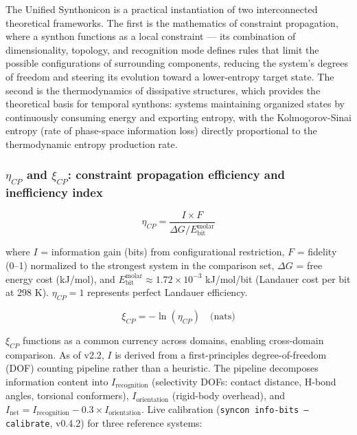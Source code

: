 \documentclass[12pt,a4paper]{article}
\begin{document}
The Unified Synthonicon is a practical instantiation of two interconnected theoretical frameworks. The first is the mathematics of constraint propagation, where a synthon functions as a local constraint --- its combination of dimensionality, topology, and recognition mode defines rules that limit the possible configurations of surrounding components, reducing the system's degrees of freedom and steering its evolution toward a lower-entropy target state. The second is the thermodynamics of dissipative structures, which provides the theoretical basis for temporal synthons: systems maintaining organized states by continuously consuming energy and exporting entropy, with the Kolmogorov-Sinai entropy (rate of phase-space information loss) directly proportional to the thermodynamic entropy production rate.

\subsubsection{$\eta_{CP}$ and $\xi_{CP}$: constraint propagation efficiency and inefficiency index}

\[\eta_{CP} = \frac{I \times F}{\Delta G / E_{\text{bit}}^{\text{molar}}}\]

where $I$ = information gain (bits) from configurational restriction, $F$ = fidelity (0--1) normalized to the strongest system in the comparison set, $\Delta G$ = free energy cost (kJ/mol), and $E_{\text{bit}}^{\text{molar}} \approx 1.72 \times 10^{-3}$ kJ/mol/bit (Landauer cost per bit at 298 K). $\eta_{CP} = 1$ represents perfect Landauer efficiency.

\[\xi_{CP} = -\ln(\eta_{CP}) \quad \text{(nats)}\]

$\xi_{CP}$ functions as a common currency across domains, enabling cross-domain comparison. As of v2.2, $I$ is derived from a first-principles degree-of-freedom (DOF) counting pipeline rather than a heuristic. The pipeline decomposes information content into $I_{\text{recognition}}$ (selectivity DOFs: contact distance, H-bond angles, torsional conformers), $I_{\text{orientation}}$ (rigid-body overhead), and $I_{\text{net}} = I_{\text{recognition}} - 0.3 \times I_{\text{orientation}}$. Live calibration (\texttt{syncon info-bits --calibrate}, v0.4.2) for three reference systems:
\end{document}
